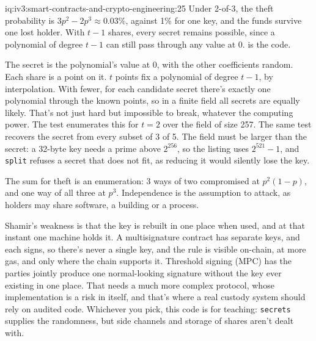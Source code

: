 \begin{solution}{iq:iv3:smart-contracts-and-crypto-engineering:25}
Under 2-of-3, the theft probability is $3p^2 - 2p^3 \approx 0.03\%$, against 1\% for one key, and the funds survive one lost holder. With $t - 1$ shares, every secret remains possible, since a polynomial of degree $t - 1$ can still pass through any value at $0$.  is the code.
\label{lst:iv3:cr:shamir}

The secret is the polynomial's value at 0, with the other coefficients random. Each share is a point on it. $t$ points fix a polynomial of degree $t - 1$, by interpolation. With fewer, for each candidate secret there's exactly one polynomial through the known points, so in a finite field all secrets are equally likely. That's not just hard but impossible to break, whatever the computing power. The test enumerates this for $t = 2$ over the field of size 257. The same test recovers the secret from every subset of 3 of 5. The field must be larger than the secret: a 32-byte key needs a prime above $2^{256}$, so the listing uses $2^{521} - 1$, and \texttt{split} refuses a secret that does not fit, as reducing it would silently lose the key.

The sum for theft is an enumeration: 3 ways of two compromised at $p^2(1-p)$, and one way of all three at $p^3$. Independence is the assumption to attack, as holders may share software, a building or a process.

Shamir's weakness is that the key is rebuilt in one place when used, and at that instant one machine holds it. A multisignature contract has separate keys, and each signs, so there's never a single key, and the rule is visible on-chain, at more gas, and only where the chain supports it. Threshold signing (MPC) has the parties jointly produce one normal-looking signature without the key ever existing in one place. That needs a much more complex protocol, whose implementation is a risk in itself, and that's where a real custody system should rely on audited code. Whichever you pick, this code is for teaching: \texttt{secrets} supplies the randomness, but side channels and storage of shares aren't dealt with.

\end{solution}

